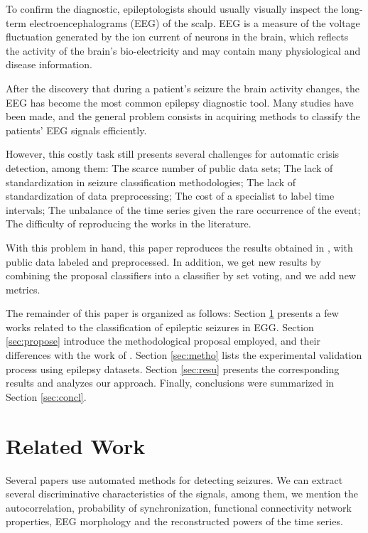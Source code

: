 To confirm the diagnostic, epileptologists should usually visually inspect the long-term electroencephalograms (EEG) of the scalp. EEG is a measure of the voltage fluctuation generated by the ion current of neurons in the brain, which reflects the activity of the brain’s bio-electricity and may contain many physiological and disease information. 

After the discovery that during a patient's seizure the brain activity changes, the EEG has become the most common epilepsy diagnostic tool. Many studies have been made, and the general problem consists in acquiring methods to classify the patients' EEG signals efficiently. 

However, this costly task still presents several challenges for automatic crisis detection, among them: The scarce number of public data sets; The lack of standardization in seizure classification methodologies; The lack of standardization of data preprocessing; The cost of a specialist to label time intervals; The unbalance of the time series given the rare occurrence of the event; The difficulty of reproducing the works in the literature.

With this problem in hand, this paper reproduces the results obtained in \cite{WenZha:2018}, with public data labeled and preprocessed. In addition, we get new results by combining the proposal classifiers into a classifier by set voting, and we add new metrics.

The remainder of this paper is organized as follows: Section \ref{sec:related} presents a few works related to the classification of epileptic seizures in EGG. Section \ref{sec:propose} introduce the methodological proposal employed, and their differences with the work of \cite{WenZha:2018}. Section \ref{sec:metho} lists the experimental validation process using epilepsy datasets. Section \ref{sec:resu} presents the corresponding results and analyzes our approach. Finally, conclusions were summarized in Section \ref{sec:concl}.


\section{Related Work}
\label{sec:related}

Several papers use automated methods for detecting seizures. We can extract several discriminative characteristics of the signals, among them, we mention the autocorrelation, probability of synchronization, functional connectivity network properties, EEG morphology and the reconstructed powers of the time series. 

